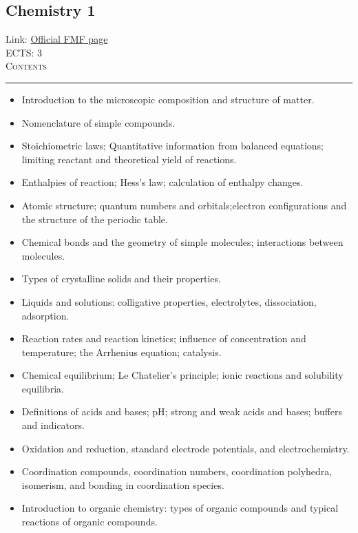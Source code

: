 \documentclass[11pt, a4paper]{article}
\newenvironment{course}[3]{
\subsection{#1}%
Link: \href{#2}{Official FMF page}\\%
ECTS: #3%
\vspace{1ex}
\\
{\large \textsc{Contents}}\\[-0.9ex]%
\rule{\textwidth}{0.5pt}
\vspace{-3ex}
}
{}
\newenvironment{chapter}[1]{
\begin{tcolorbox}[title=#1, breakable]
}
{\end{tcolorbox}}
\begin{document}
\begin{course}{Chemistry 1}{https://www.fmf.uni-lj.si/en/study-physics/programmes/1fiz/2020/7000777/courses/1152/}{3}
    \label{chemistry-1}

    \begin{chapter}{Material}
        \begin{itemize}
            
            \item Introduction to the microscopic composition and structure of matter.

            \item Nomenclature of simple compounds.

            \item Stoichiometric laws; Quantitative information from balanced equations; limiting reactant and theoretical yield of reactions.

            \item Enthalpies of reaction; Hess's law; calculation of enthalpy changes.

            \item Atomic structure; quantum numbers and orbitals;electron configurations and the structure of the periodic table.

            \item Chemical bonds and the geometry of simple molecules; interactions between molecules.

            \item Types of crystalline solids and their properties.

            \item Liquids and solutions: colligative properties, electrolytes, dissociation, adsorption.

            \item Reaction rates and reaction kinetics; influence of concentration and temperature; the Arrhenius equation; catalysis.

            \item Chemical equilibrium; Le Chatelier's principle; ionic reactions and solubility equilibria.

            \item Definitions of acids and bases; pH; strong and weak acids and bases; buffers and indicators.

            \item Oxidation and reduction, standard electrode potentials, and electrochemistry.

            \item Coordination compounds, coordination numbers, coordination polyhedra, isomerism, and bonding in coordination species.

            \item Introduction to organic chemistry: types of organic compounds and typical reactions of organic compounds.
            
        \end{itemize}
    \end{chapter}

\end{course}
\end{document}
